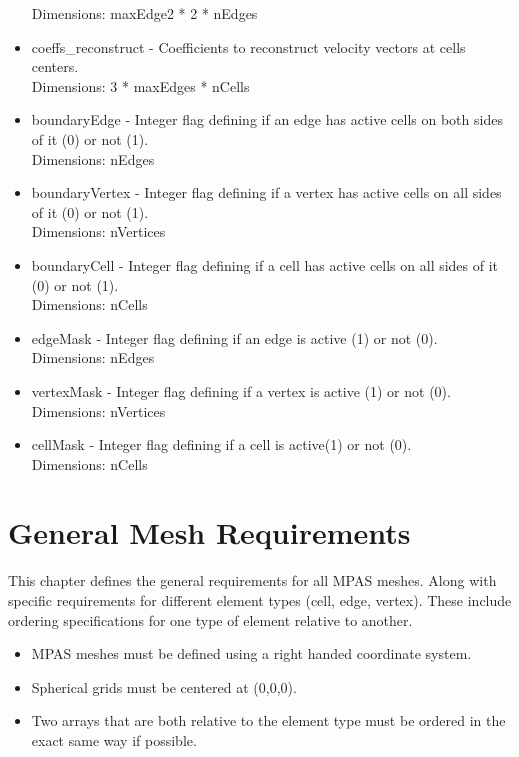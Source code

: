 \documentclass[11pt]{report}
\begin{document}
\begin{itemize}
		  Dimensions: maxEdge2 * 2 * nEdges
	\item coeffs\_reconstruct - Coefficients to reconstruct velocity vectors at cells centers. \\
		  Dimensions: 3 * maxEdges * nCells
	\item boundaryEdge - Integer flag defining if an edge has active cells on both sides of it (0) or not (1). \\
		  Dimensions: nEdges
	\item boundaryVertex - Integer flag defining if a vertex has active cells on all sides of it (0) or not (1). \\
		  Dimensions: nVertices
	\item boundaryCell - Integer flag defining if a cell has active cells on all sides of it (0) or not (1). \\
		  Dimensions: nCells
	\item edgeMask - Integer flag defining if an edge is active (1) or not (0). \\
		  Dimensions: nEdges
	\item vertexMask - Integer flag defining if a vertex is active (1) or not (0). \\
		  Dimensions: nVertices
	\item cellMask - Integer flag defining if a cell is active(1) or not (0). \\
		  Dimensions: nCells
\end{itemize}


\chapter{General Mesh Requirements}

This chapter defines the general requirements for all MPAS meshes. Along with specific requirements for different element types (cell, edge, vertex). These include ordering specifications for one type of element relative to another.

\begin{itemize}
	\item MPAS meshes must be defined using a right handed coordinate system.
	\item Spherical grids must be centered at (0,0,0).
	\item Two arrays that are both relative to the element type must be ordered in the exact same way if possible.
\end{itemize}
\end{document}
